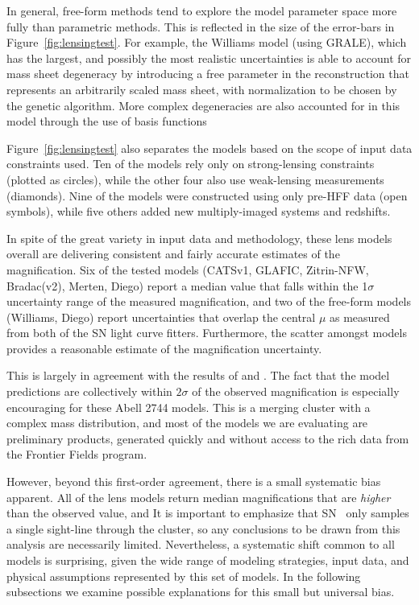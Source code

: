 In general, free-form methods tend to explore the model parameter
space more fully than parametric methods.  This is reflected in the
size of the error-bars in Figure~\ref{fig:lensingtest}.  For example,
the Williams model (using GRALE), which has the largest, and possibly the
most realistic uncertainties is able to account for mass sheet
degeneracy by introducing a free parameter in the reconstruction that
represents an arbitrarily scaled mass sheet, with normalization to
be chosen by the genetic algorithm.  More complex degeneracies are
also accounted for in this model through the use of basis
functions \citep{Liesenborgs:2006,Liesenborgs:2007,Mohammed:2014}

Figure~\ref{fig:lensingtest} also separates the models based on the
scope of input data constraints used.  Ten of the models rely only on
strong-lensing constraints (plotted as circles), while the other four
also use weak-lensing measurements (diamonds).  Nine of the models
were constructed using only pre-HFF data (open symbols), while five
others added new multiply-imaged systems and redshifts.

In spite of the great variety in input data and methodology, these
lens models overall are delivering consistent and fairly accurate
estimates of the magnification.  Six of the tested models
(CATSv1, GLAFIC, Zitrin-NFW, Bradac(v2), Merten, Diego) report a median
value that falls within the 1$\sigma$ uncertainty range of the
measured magnification, and two of the free-form models (Williams,
Diego) report uncertainties that overlap the central $\mu$ as measured
from both of the SN light curve fitters.  Furthermore, the scatter
amongst models provides a reasonable estimate of the magnification
uncertainty.

This is largely in agreement with the results
of  and \citet{Nordin:2014}.  The fact that the
model predictions are collectively within $2\sigma$ of the observed
magnification is especially encouraging for these Abell 2744
models. This is a merging cluster with a complex mass distribution,
and most of the models we are evaluating are preliminary products,
generated quickly and without access to the rich data from the
Frontier Fields program.

However, beyond this first-order agreement, there is a small
systematic bias apparent. All of the lens models 
return median magnifications that are {\it higher} than the observed
value, and 
It is important to emphasize that SN \tomas\ only samples a single
sight-line through the cluster, so any conclusions to be drawn from
this analysis are necessarily limited.  Nevertheless, a systematic
shift common to all models is surprising, given the wide range of
modeling strategies, input data, and physical assumptions represented
by this set of models.  In the following subsections we examine
possible explanations for this small but  universal
bias.

